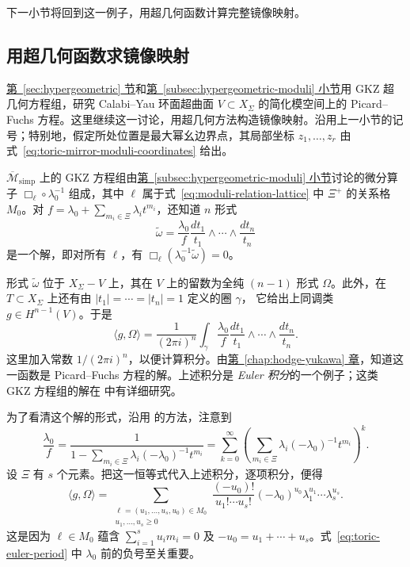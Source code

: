 \begin{example}
下一小节将回到这一例子，用超几何函数计算完整镜像映射。
\end{example}

\subsection{用超几何函数求镜像映射}\label{subsec:hypergeometric-mirror-map}
\hyperref[sec:hypergeometric]{第~\ref*{sec:hypergeometric} 节}和\hyperref[subsec:hypergeometric-moduli]{第~\ref*{subsec:hypergeometric-moduli} 小节}用 GKZ 超几何方程组，研究 Calabi--Yau 环面超曲面 $V\subset X_\Sigma$ 的简化模空间上的 Picard--Fuchs 方程。这里继续这一讨论，用超几何方法构造镜像映射。沿用上一小节的记号；特别地，假定所处位置是最大幂幺边界点，其局部坐标 $z_1,\ldots,z_r$ 由式~\eqref{eq:toric-mirror-moduli-coordinates} 给出。

$\overline{\mathcal M}_{\mathrm{simp}}$ 上的 GKZ 方程组由\hyperref[subsec:hypergeometric-moduli]{第~\ref*{subsec:hypergeometric-moduli} 小节}讨论的微分算子 $\Box_\ell\circ\lambda_0^{-1}$ 组成，其中 $\ell$ 属于式~\eqref{eq:moduli-relation-lattice} 中 $\Xi^+$ 的关系格 $M_0$。对 $f=\lambda_0+\sum_{m_i\in\Xi}\lambda_i t^{m_i}$，还知道 $n$ 形式
\[
\widetilde\omega=\frac{\lambda_0}{f}\frac{dt_1}{t_1}\wedge\cdots\wedge\frac{dt_n}{t_n}
\]
是一个解，即对所有 $\ell$，有 $\Box_\ell(\lambda_0^{-1}\widetilde\omega)=0$。

形式 $\widetilde\omega$ 位于 $X_\Sigma-V$ 上，其在 $V$ 上的留数为全纯 $(n-1)$ 形式 $\Omega$。此外，在 $T\subset X_\Sigma$ 上还有由 $|t_1|=\cdots=|t_n|=1$ 定义的圈 $\gamma$，
它给出上同调类 $g\in H^{n-1}(V)$。于是
\[
\langle g,\Omega\rangle=\frac1{(2\pi i)^n}\int_\gamma
\frac{\lambda_0}{f}\frac{dt_1}{t_1}\wedge\cdots\wedge\frac{dt_n}{t_n}.
\]
这里加入常数 $1/(2\pi i)^n$，以便计算积分。由\hyperref[chap:hodge-yukawa]{第~\ref*{chap:hodge-yukawa} 章}，知道这一函数是 Picard--Fuchs 方程的解。上述积分是 \emph{Euler 积分}的一个例子；这类 GKZ 方程组的解在  中有详细研究。

为了看清这个解的形式，沿用  的方法，注意到
\[
\frac{\lambda_0}{f}
=\frac1{1-\sum_{m_i\in\Xi}\lambda_i(-\lambda_0)^{-1}t^{m_i}}
=\sum_{k=0}^\infty
\left(\sum_{m_i\in\Xi}\lambda_i(-\lambda_0)^{-1}t^{m_i}\right)^k.
\]
设 $\Xi$ 有 $s$ 个元素。把这一恒等式代入上述积分，逐项积分，便得
\begin{equation}\label{eq:toric-euler-period}
\langle g,\Omega\rangle=
\sum_{\substack{\ell=(u_1,\ldots,u_s,u_0)\in M_0\\u_1,\ldots,u_s\geq0}}
\frac{(-u_0)!}{u_1!\cdots u_s!}(-\lambda_0)^{u_0}
\lambda_1^{u_1}\cdots\lambda_s^{u_s}.
\end{equation}
这是因为 $\ell\in M_0$ 蕴含 $\sum_{i=1}^su_i m_i=0$ 及 $-u_0=u_1+\cdots+u_s$。式~\eqref{eq:toric-euler-period} 中 $\lambda_0$ 前的负号至关重要。

